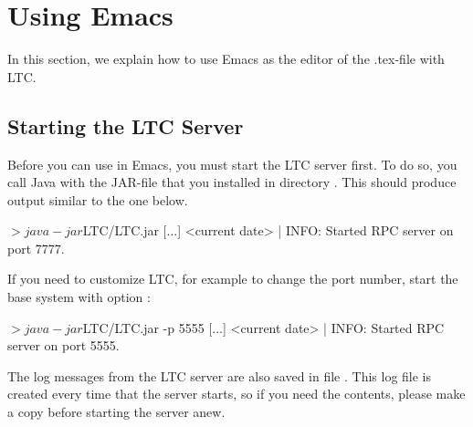 \section{Using Emacs} \label{sec:emacs}

In this section, we explain how to use Emacs as the editor of the .tex-file with LTC.

\begin{center}
\end{center}

\subsection{Starting the LTC Server}

Before you can use  in Emacs, you must start the LTC server first.  To do so, you call Java with the JAR-file that you installed in directory .  This should produce output similar to the one below. 

\begin{CodeVerbatim}
$> java -jar $LTC/LTC.jar 
[...]
<current date> | INFO: 	Started RPC server on port 7777.
\end{CodeVerbatim}

If you need to customize LTC, for example to change the port number, start the base system with option :

\begin{CodeVerbatim}
$> java -jar $LTC/LTC.jar -p 5555
[...]
<current date> | INFO: 	Started RPC server on port 5555.
\end{CodeVerbatim}

The log messages from the LTC server are also saved in file .  This log file is created every time that the server starts, so if you need the contents, please make a copy before starting the server anew.

